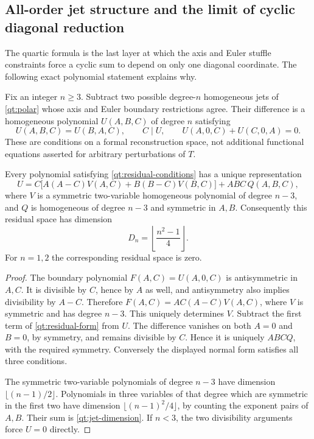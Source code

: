 \subsection{All-order jet structure and the limit of cyclic diagonal reduction}

The quartic formula is the last layer at which the axis and Euler
stuffle constraints force a cyclic sum to depend on only one diagonal
coordinate. The following exact polynomial statement explains why.

Fix an integer $n\ge3$. Subtract two possible degree-$n$ homogeneous
jets of \eqref{qt:polar} whose axis and Euler boundary restrictions
agree. Their difference is a homogeneous polynomial $U(A,B,C)$
of degree $n$ satisfying
\begin{equation}\label{qt:residual-conditions}
 U(A,B,C)=U(B,A,C),\qquad C\mid U,\qquad
 U(A,0,C)+U(C,0,A)=0.
\end{equation}
These are conditions on a formal reconstruction space, not additional
functional equations asserted for arbitrary perturbations of $T$.

\begin{theorem}\label{qt:all-order-space}
Every polynomial satisfying \eqref{qt:residual-conditions} has a unique
representation
\begin{equation}\label{qt:residual-form}
 U=C\bigl[A(A-C)V(A,C)+B(B-C)V(B,C)\bigr]+ABC\,Q(A,B,C),
\end{equation}
where $V$ is a symmetric two-variable homogeneous polynomial of degree
$n-3$, and $Q$ is homogeneous of degree $n-3$ and symmetric in $A,B$.
Consequently this residual space has dimension
\begin{equation}\label{qt:jet-dimension}
 D_n=\left\lfloor\frac{n^2-1}{4}\right\rfloor.
\end{equation}
For $n=1,2$ the corresponding residual space is zero.
\end{theorem}
\begin{proof}
The boundary polynomial $F(A,C)=U(A,0,C)$ is antisymmetric in $A,C$.
It is divisible by $C$, hence by $A$ as well, and antisymmetry also
implies divisibility by $A-C$. Therefore
$F(A,C)=AC(A-C)V(A,C)$, where $V$ is symmetric and has degree
$n-3$. This uniquely determines $V$. Subtract the first term of
\eqref{qt:residual-form} from $U$. The difference vanishes on both
$A=0$ and $B=0$, by symmetry, and remains divisible by $C$.
Hence it is uniquely $ABCQ$, with the required symmetry.
Conversely the displayed normal form satisfies all three conditions.

The symmetric two-variable polynomials of degree $n-3$ have dimension
$\lfloor(n-1)/2\rfloor$. Polynomials in three variables of that degree
which are symmetric in the first two have dimension
$\lfloor(n-1)^2/4\rfloor$, by counting the exponent pairs of $A,B$.
Their sum is \eqref{qt:jet-dimension}. If $n<3$, the two divisibility
arguments force $U=0$ directly.
\end{proof}


